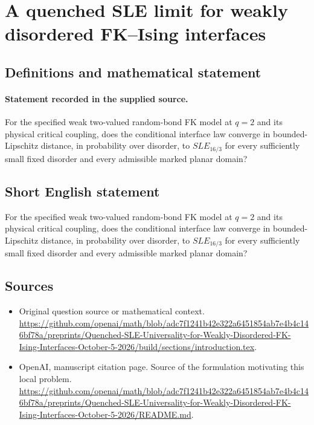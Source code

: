 \documentclass[11pt]{article}
\begin{document}
\section*{A quenched SLE limit for weakly disordered FK–Ising interfaces}\label{30007408}
\subsection{Definitions and mathematical statement}
\paragraph{Statement recorded in the supplied source.}
For the specified weak two-valued random-bond FK model at $q=2$ and its physical critical coupling, does the conditional interface law converge in bounded-Lipschitz distance, in probability over disorder, to $SLE_{16/3}$ for every sufficiently small fixed disorder and every admissible marked planar domain?
\subsection{Short English statement}
For the specified weak two-valued random-bond FK model at $q=2$ and its physical critical coupling, does the conditional interface law converge in bounded-Lipschitz distance, in probability over disorder, to $SLE_{16/3}$ for every sufficiently small fixed disorder and every admissible marked planar domain?
\subsection{Sources}
\begin{itemize}
\item[S1] Original question source or mathematical context.
\url{https://github.com/openai/math/blob/adc7f1241b42e322a6451854ab7e4b4c146bf78a/preprints/Quenched-SLE-Universality-for-Weakly-Disordered-FK-Ising-Interfaces-October-5-2026/build/sections/introduction.tex}.
\item[S2] OpenAI, manuscript citation page. Source of the formulation motivating this local problem.
\url{https://github.com/openai/math/blob/adc7f1241b42e322a6451854ab7e4b4c146bf78a/preprints/Quenched-SLE-Universality-for-Weakly-Disordered-FK-Ising-Interfaces-October-5-2026/README.md}.
\end{itemize}
\end{document}
